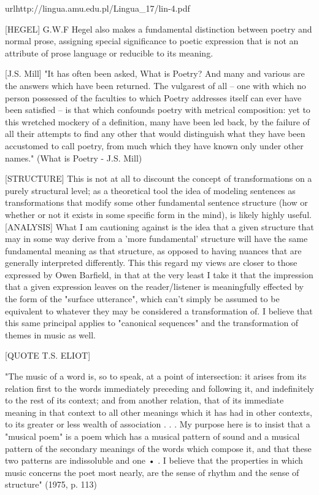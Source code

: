 \documentclass[]{article}
\begin{document}
url{http://lingua.amu.edu.pl/Lingua_17/lin-4.pdf}



[HEGEL] G.W.F Hegel also makes a fundamental distinction between poetry and normal prose, assigning special significance to poetic expression that is not an attribute of prose language or reducible to its meaning.



[J.S. Mill] "It has often been asked, What is Poetry? And many and various are the answers which have been returned. The vulgarest of all – one with which no person possessed of the faculties to which Poetry addresses itself can ever have been satisfied – is that which confounds poetry with metrical composition: yet to this wretched mockery of a definition, many have been led back, by the failure of all their attempts to find any other that would distinguish what they have been accustomed to call poetry, from much which they have known only under other names." (What is Poetry - J.S. Mill)



[STRUCTURE] This is not at all to discount the concept of transformations on a purely structural level; as a theoretical tool the idea of modeling sentences as transformations that modify some other fundamental sentence structure (how or whether or not it exists in some specific form in the mind), is likely highly useful. [ANALYSIS] What I am cautioning against is the idea that a given structure that may in some way derive from a 'more fundamental' structure will have the same fundamental meaning as that structure, as opposed to having nuances that are generally interpreted differently. This this regard my views are closer to those expressed by Owen Barfield, in that at the very least I take it that the impression that a given expression leaves on the reader/listener is meaningfully effected by the form of the "surface utterance", which can't simply be assumed to be equivalent to whatever they may be considered a transformation of. I believe that this same principal applies to "canonical sequences" and the transformation of themes in music as well.



[QUOTE T.S. ELIOT]

"The music of a word is, so to speak, at a point of intersection: it arises from its relation first to the words immediately preceding and following it, and indefinitely to the rest of its context; and from another relation, that of its immediate meaning in that context to all other meanings which it has had in other contexts, to its greater or less wealth of association . . . My purpose here is to insist that a "musical poem" is a poem which has a musical pattern of sound and a musical pattern of the secondary meanings of the words which compose it, and that these two patterns are indissoluble and one • . I believe that the properties in which music concerns the poet most nearly, are the sense of rhythm and the sense of structure" (1975, p. 113)
\end{document}
